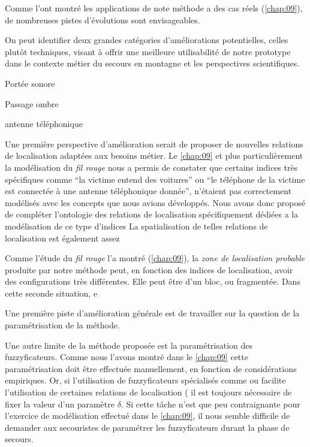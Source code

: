 Comme l'ont montré les applications de note méthode a des cas réels
(\autoref{chap:09}), de nombreuses pistes d'évolutions sont
envisageables.

On peut identifier deux grandes catégories d'améliorations
potentielles, celles plutôt techniques, visant à offrir une meilleure
utilisabilité de notre prototype dans le contexte métier du secours en
montagne et les perspectives scientifiques.


Portée sonore

Passage ombre

antenne téléphonique

Une première perspective d'amélioration serait de proposer de
nouvelles relations de localisation adaptées aux besoins métier. Le
\autoref{chap:09} et plus particulièrement la modélisation du
\emph{fil rouge} nous a permis de constater que certains indices très
spécifiques comme \enquote{la victime entend des voitures} ou
\enquote{le téléphone de la victime est connectée à une antenne
  téléphonique donnée}, n'étaient pas correctement modélisés avec les
concepts que nous avions développés.
%
Nous avons donc proposé de compléter l'ontologie des relations de
localisation spécifiquement dédiées a la modélisation de ce type
d'indices
%
La spatialisation de telles relations de localisation est également
assez 



Comme l'étude du \emph{fil rouge} l'a montré (\autoref{chap:09}), la
\emph{zone de localisation probable} produite par notre méthode peut,
en fonction des indices de localisation, avoir des configurations très
différentes. Elle peut être d'un bloc, ou fragmentée. Dans cette
seconde situation,  e




Une première piste d'amélioration générale est de travailler sur la
question de la paramétrisation de la méthode. 


Une autre limite de la méthode proposée est la paramétrisation des
fuzzyficateurs. Comme nous l'avons montré dans le \autoref{chap:09}
cette paramétrisation doit être effectuée manuellement, en fonction de
considérations empiriques. Or, si l'utilisation de fuzzyficateurs
spécialisés comme  ou 
facilite l'utilisation de certaines relations de localisation (\eg
{} il est toujours nécessaire de fixer la valeur
d'un paramètre \(\delta\). Si cette tâche n'est que peu contraignante
pour l'exercice de modélisation effectué dans le \autoref{chap:09}, il
nous semble difficile de demander aux secouristes de paramétrer les
fuzzyficateurs durant la phase de secours.

